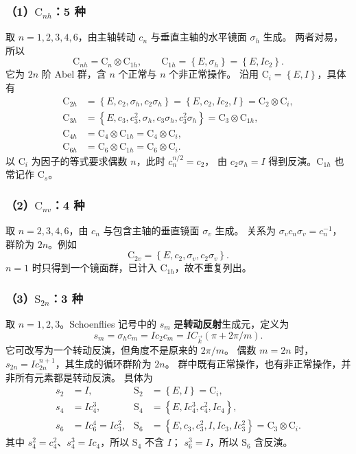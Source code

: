 \subsubsection*{（1）$\mathrm{C}_{nh}$：5 种}
取 $n=1,2,3,4,6$，由主轴转动 $c_n$ 与垂直主轴的水平镜面 $\sigma_h$ 生成。
两者对易，所以
\begin{equation}
\mathrm{C}_{nh}=\mathrm{C}_n\otimes\mathrm{C}_{1h},\qquad
\mathrm{C}_{1h}=\left\{E,\sigma_h\right\}=\left\{E,Ic_2\right\}.
\end{equation}
它为 $2n$ 阶 Abel 群，含 $n$ 个正常与 $n$ 个非正常操作。
沿用 $\mathrm{C}_i=\left\{E,I\right\}$，具体有
\begin{align}
\mathrm{C}_{2h}&=\left\{E,c_2,\sigma_h,c_2\sigma_h\right\}
=\left\{E,c_2,Ic_2,I\right\}=\mathrm{C}_2\otimes\mathrm{C}_i,\\
\mathrm{C}_{3h}&=\left\{E,c_3,c_3^2,\sigma_h,c_3\sigma_h,c_3^2\sigma_h\right\}
=\mathrm{C}_3\otimes\mathrm{C}_{1h},\\
\mathrm{C}_{4h}&=\mathrm{C}_4\otimes\mathrm{C}_{1h}=\mathrm{C}_4\otimes\mathrm{C}_i,\\
\mathrm{C}_{6h}&=\mathrm{C}_6\otimes\mathrm{C}_{1h}=\mathrm{C}_6\otimes\mathrm{C}_i.
\end{align}
以 $\mathrm{C}_i$ 为因子的等式要求偶数 $n$，此时 $c_n^{n/2}=c_2$，
由 $c_2\sigma_h=I$ 得到反演。$\mathrm{C}_{1h}$ 也常记作 $\mathrm{C}_s$。

\subsubsection*{（2）$\mathrm{C}_{nv}$：4 种}
取 $n=2,3,4,6$，由 $c_n$ 与包含主轴的垂直镜面 $\sigma_v$ 生成。
关系为 $\sigma_vc_n\sigma_v=c_n^{-1}$，群阶为 $2n$。例如
\begin{equation}
\mathrm{C}_{2v}=\left\{E,c_2,\sigma_v,c_2\sigma_v\right\}.
\end{equation}
$n=1$ 时只得到一个镜面群，已计入 $\mathrm{C}_{1h}$，故不重复列出。

\subsubsection*{（3）$\mathrm{S}_{2n}$：3 种}
取 $n=1,2,3$。Schoenflies 记号中的 $s_m$ 是\textbf{转动反射}生成元，定义为
\begin{equation}
s_m=\sigma_hc_m=Ic_2c_m=IC_{\vec k}\left(\pi+2\pi/m\right).
\end{equation}
它可改写为一个转动反演，但角度不是原来的 $2\pi/m$。
偶数 $m=2n$ 时，$s_{2n}=Ic_{2n}^{n+1}$，其生成的循环群阶为 $2n$。
群中既有正常操作，也有非正常操作，并非所有元素都是转动反演。
具体为
\begin{align}
s_2&=I,&\mathrm{S}_2&=\left\{E,I\right\}=\mathrm{C}_i,\\
s_4&=Ic_4^3,&\mathrm{S}_4&=\left\{E,Ic_4^3,c_4^2,Ic_4\right\},\\
s_6&=Ic_6^4=Ic_3^2,&\mathrm{S}_6&=\left\{E,c_3,c_3^2,I,Ic_3,Ic_3^2\right\}
=\mathrm{C}_3\otimes\mathrm{C}_i.
\end{align}
其中 $s_4^2=c_4^2$、$s_4^3=Ic_4$，所以 $\mathrm{S}_4$ 不含 $I$；
$s_6^3=I$，所以 $\mathrm{S}_6$ 含反演。

